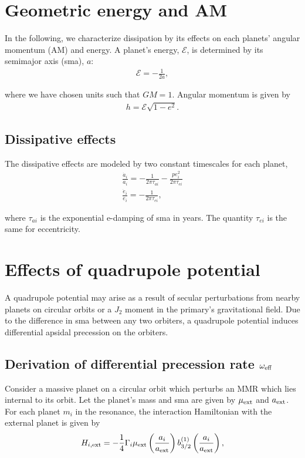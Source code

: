 \documentclass[11pt]{article}
\begin{document}
\section{Geometric energy and AM}
\label{sec:org42d3f50}
In the following, we characterize dissipation by its effects on each
planets' angular momentum (AM) and energy.  A planet's energy,
\(\mathcal E\), is determined by its semimajor axis (sma), \(a\):
\begin{align}
   \mathcal E = -\frac{1}{2a},
\end{align}
\noindent

\noindent
where we have chosen units such that \(GM=1\).
Angular momentum is given by
\begin{align}
h = \mathcal E \sqrt{1-e^2}.
\end{align}

\subsection{Dissipative effects}
\label{sec:org44b9bd0}
The dissipative effects are modeled
by two constant timescales for each planet, 
\begin{align}
  \frac{\dot a_i}{a_i} = -\frac{1}{2\pi\tau_{ai}} - \frac{pe_i^2}{2\pi\tau_{ei}} \\
  \frac{\dot e_i}{e_i} = -\frac{1}{2\pi\tau_{ei}} ,
\end{align}

where \(\tau_{ai}\) is the exponential e-damping of sma in years.  The
quantity \(\tau_{ei}\) is the same for eccentricity.

\section{Effects of quadrupole potential}
\label{sec:org78655e2}
A quadrupole potential may arise as a result of secular perturbations
from nearby planets on circular orbits or a \(J_2\) moment in the
primary's gravitational field. Due to the difference in sma
between any two orbiters, a quadrupole potential induces
differential apsidal precession on the orbiters.

\subsection{Derivation of differential precession rate \(\omega_{\rm eff}\)}
\label{sec:org3e5fb2b}
Consider a massive planet on a circular orbit which perturbs an MMR
which lies internal to its orbit.  Let the planet's mass and sma are
given by \(\mu_{\rm ext}\) and \(a_{\rm ext}\).  For each planet \(m_i\) in
the resonance, the interaction Hamiltonian with the external
planet is given by
\begin{equation}
  H_{i,\rm ext} = -\frac14 \Gamma_i \mu_{\rm ext}
  \left(\frac{a_i}{a_{\rm ext}}\right) b_{3/2}^{(1)}\left(\frac{a_i}{a_{\rm ext}}\right),
\end{equation}
\end{document}
